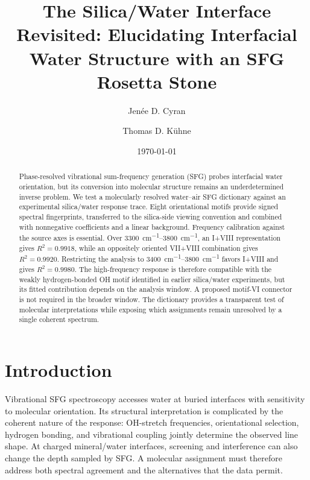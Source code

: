 \documentclass[aip,jcp,reprint,amsmath,amssymb]{revtex4-2}
\newcommand{\sfg}{SFG\xspace}
\begin{document}
\title{The Silica/Water Interface Revisited: Elucidating Interfacial Water Structure with an SFG Rosetta Stone}

\author{Jen{\'e}e D. Cyran}

\author{Thomas D. K{\"u}hne}

\date{\today}

\begin{abstract}
Phase-resolved vibrational sum-frequency generation (SFG) probes interfacial water orientation, but its conversion into molecular structure remains an underdetermined inverse problem. We test a molecularly resolved water--air SFG dictionary against an experimental silica/water response trace. Eight orientational motifs provide signed spectral fingerprints, transferred to the silica-side viewing convention and combined with nonnegative coefficients and a linear background. Frequency calibration against the source axes is essential. Over \SIrange{3300}{3800}{cm^{-1}}, an I+VIII representation gives $R^2=0.9918$, while an oppositely oriented VII+VIII combination gives $R^2=0.9920$. Restricting the analysis to \SIrange{3400}{3800}{cm^{-1}} favors I+VIII and gives $R^2=0.9980$. The high-frequency response is therefore compatible with the weakly hydrogen-bonded OH motif identified in earlier silica/water experiments, but its fitted contribution depends on the analysis window. A proposed motif-VI connector is not required in the broader window. The dictionary provides a transparent test of molecular interpretations while exposing which assignments remain unresolved by a single coherent spectrum.
\end{abstract}

\maketitle

\section{Introduction}

Vibrational \sfg spectroscopy accesses water at buried interfaces with sensitivity to molecular orientation.\cite{Shen2006ChemRev,Bakker2016ChemRev,Bonn2015Angew,Tang2020ChemRev} Its structural interpretation is complicated by the coherent nature of the response: OH-stretch frequencies, orientational selection, hydrogen bonding, and vibrational coupling jointly determine the observed line shape. At charged mineral/water interfaces, screening and interference can also change the depth sampled by \sfg.\cite{Schaefer2017PCCP} A molecular assignment must therefore address both spectral agreement and the alternatives that the data permit.
\end{document}
